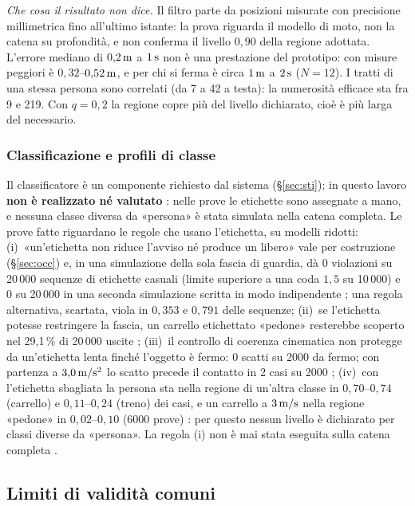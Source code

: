 \emph{Che cosa il risultato non dice.} Il filtro parte da posizioni misurate con precisione millimetrica fino all'ultimo istante: la prova riguarda il modello di moto, non la catena su profondità, e non conferma il livello $0{,}90$ della regione adottata. L'errore mediano di $0{,}2\,\mathrm{m}$ a $1\,\mathrm{s}$ non è una prestazione del prototipo: con misure peggiori è $0{,}32$--$0{,}52\,\mathrm{m}$, e per chi si ferma è circa $1\,\mathrm{m}$ a $2\,\mathrm{s}$ ($N=12$). I tratti di una stessa persona sono correlati (da 7 a 42 a testa): la numerosità efficace sta fra 9 e 219. Con $q=0{,}2$ la regione copre più del livello dichiarato, cioè è più larga del necessario.

\subsubsection*{Classificazione e profili di classe}

Il classificatore è un componente richiesto dal sistema (\S\ref{sec:sti}); in questo lavoro \textbf{non è realizzato né valutato} : nelle prove le etichette sono assegnate a mano, e nessuna classe diversa da «persona» è stata simulata nella catena completa. Le prove fatte riguardano le regole che usano l'etichetta, su modelli ridotti: (i)~«un'etichetta non riduce l'avviso né produce un libero» vale per costruzione (\S\ref{sec:occ}) e, in una simulazione della sola fascia di guardia, dà 0 violazioni su 20\,000 sequenze di etichette casuali (limite superiore a una coda $1{,}5$ su 10\,000) e 0 su 20\,000 in una seconda simulazione scritta in modo indipendente ; una regola alternativa, scartata, viola in $0{,}353$ e $0{,}791$ delle sequenze; (ii)~se l'etichetta potesse restringere la fascia, un carrello etichettato «pedone» resterebbe scoperto nel 29,1\,\% di 20\,000 uscite ; (iii)~il controllo di coerenza cinematica non protegge da un'etichetta lenta finché l'oggetto è fermo: 0 scatti su 2000 da fermo; con partenza a $3{,}0\,\mathrm{m/s^2}$ lo scatto precede il contatto in 2 casi su 2000 ; (iv)~con l'etichetta sbagliata la persona sta nella regione di un'altra classe in $0{,}70$–$0{,}74$ (carrello) e $0{,}11$–$0{,}24$ (treno) dei casi, e un carrello a $3\,\mathrm{m/s}$ nella regione «pedone» in $0{,}02$–$0{,}10$ (6000 prove) : per questo nessun livello è dichiarato per classi diverse da «persona». La regola (i) non è mai stata eseguita sulla catena completa .

\subsection{Limiti di validità comuni}\label{sec:val-limiti}


